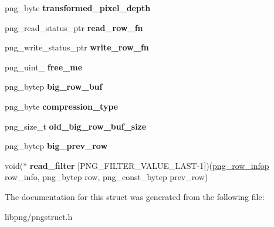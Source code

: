 \begin{DoxyCompactItemize}
\item 
\hypertarget{structpng__struct__def_aa4e37c14d96c7057389a7cb2ca839290}{png\-\_\-byte {\bfseries transformed\-\_\-pixel\-\_\-depth}}\label{structpng__struct__def_aa4e37c14d96c7057389a7cb2ca839290}

\item 
\hypertarget{structpng__struct__def_a0d67c044d4088f4673b90c2109ff94c0}{png\-\_\-read\-\_\-status\-\_\-ptr {\bfseries read\-\_\-row\-\_\-fn}}\label{structpng__struct__def_a0d67c044d4088f4673b90c2109ff94c0}

\item 
\hypertarget{structpng__struct__def_a1ea44e185e0f8bdd7299f93fd017c32c}{png\-\_\-write\-\_\-status\-\_\-ptr {\bfseries write\-\_\-row\-\_\-fn}}\label{structpng__struct__def_a1ea44e185e0f8bdd7299f93fd017c32c}

\item 
\hypertarget{structpng__struct__def_a610bea16ff780c149d2756b60d2e6087}{png\-\_\-uint\-\_ {\bfseries free\-\_\-me}}\label{structpng__struct__def_a610bea16ff780c149d2756b60d2e6087}

\item 
\hypertarget{structpng__struct__def_a7248deb9bb1525d1d16ee9d6187128b9}{png\-\_\-bytep {\bfseries big\-\_\-row\-\_\-buf}}\label{structpng__struct__def_a7248deb9bb1525d1d16ee9d6187128b9}

\item 
\hypertarget{structpng__struct__def_ad448c2648c447212ff66a0ec48cf1394}{png\-\_\-byte {\bfseries compression\-\_\-type}}\label{structpng__struct__def_ad448c2648c447212ff66a0ec48cf1394}

\item 
\hypertarget{structpng__struct__def_a42a732b3edf3c2fae816610beb949cc5}{png\-\_\-size\-\_\-t {\bfseries old\-\_\-big\-\_\-row\-\_\-buf\-\_\-size}}\label{structpng__struct__def_a42a732b3edf3c2fae816610beb949cc5}

\item 
\hypertarget{structpng__struct__def_a58ed983872249c948e063743eb18d427}{png\-\_\-bytep {\bfseries big\-\_\-prev\-\_\-row}}\label{structpng__struct__def_a58ed983872249c948e063743eb18d427}

\item 
\hypertarget{structpng__struct__def_a669016ed081452035d16f3a93740d663}{void($\ast$ {\bfseries read\-\_\-filter} \mbox{[}P\-N\-G\-\_\-\-F\-I\-L\-T\-E\-R\-\_\-\-V\-A\-L\-U\-E\-\_\-\-L\-A\-S\-T-\/1\mbox{]})(\hyperlink{structpng__row__info__struct}{png\-\_\-row\-\_\-infop} row\-\_\-info, png\-\_\-bytep row, png\-\_\-const\-\_\-bytep prev\-\_\-row)}\label{structpng__struct__def_a669016ed081452035d16f3a93740d663}

\end{DoxyCompactItemize}


The documentation for this struct was generated from the following file\-:\begin{DoxyCompactItemize}
\item 
libpng/pngstruct.\-h\end{DoxyCompactItemize}
